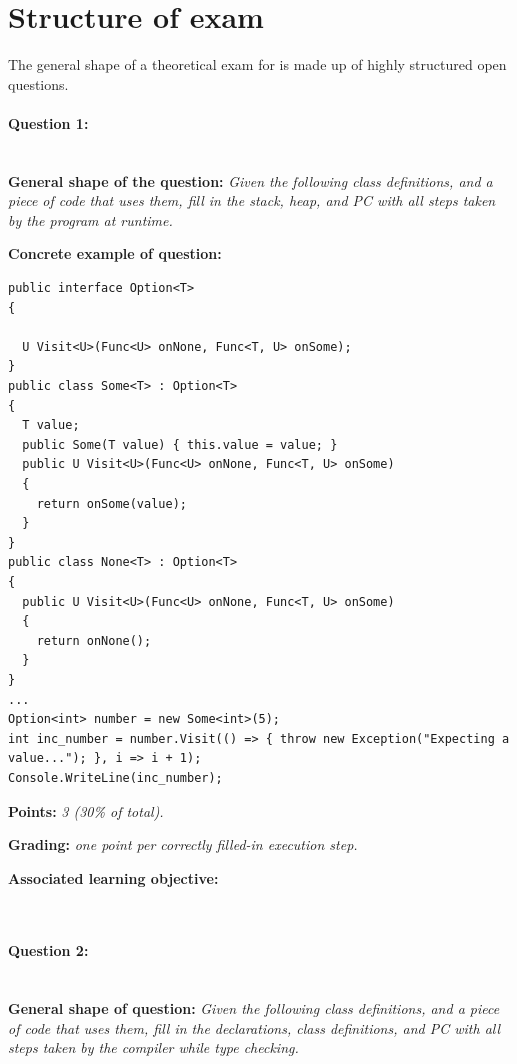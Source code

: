 \section*{Structure of exam \modulecode}
The general shape of a theoretical exam for \texttt{\modulecode} is made up of highly structured open questions.

\paragraph{Question 1: } \ \\

\textbf{General shape of the question:} \textit{Given the following class definitions, and a piece of code that uses them, fill in the stack, heap, and PC with all steps taken by the program at runtime.}

\textbf{Concrete example of question:}

\lstset{numbers=left,basicstyle=\ttfamily\small}\lstset{language=[Sharp]C}
\begin{lstlisting}
public interface Option<T>
{

  U Visit<U>(Func<U> onNone, Func<T, U> onSome);
}
public class Some<T> : Option<T>
{
  T value;
  public Some(T value) { this.value = value; }
  public U Visit<U>(Func<U> onNone, Func<T, U> onSome)
  {
    return onSome(value);
  }
}
public class None<T> : Option<T>
{
  public U Visit<U>(Func<U> onNone, Func<T, U> onSome)
  {
    return onNone();
  }
}
...
Option<int> number = new Some<int>(5);
int inc_number = number.Visit(() => { throw new Exception("Expecting a value..."); }, i => i + 1);
Console.WriteLine(inc_number);
\end{lstlisting}
\textbf{Points:} \textit{3 (30\% of total).}

\textbf{Grading:} \textit{one point per correctly filled-in execution step.}

\textbf{Associated learning objective:} 

\ \\ 

\paragraph{Question 2: } \ \\

\textbf{General shape of question:} \textit{Given the following class definitions, and a piece of code that uses them, fill in the declarations, class definitions, and PC with all steps taken by the compiler while type checking.}

